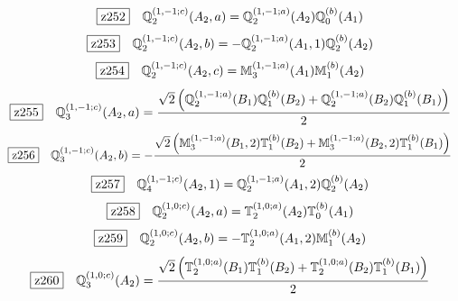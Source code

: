 \documentclass[fleqn,10pt,landscape]{jsarticle}
\begin{document}
\begin{dmath*}
\hspace*{3mm}\fbox{z252}\quad \mathbb{Q}_{2}^{(1,-1;c)}(A_{2},a)=\mathbb{Q}_{2}^{(1,-1;a)}(A_{2}) \mathbb{Q}_{0}^{(b)}(A_{1})
\end{dmath*}
\begin{dmath*}
\hspace*{3mm}\fbox{z253}\quad \mathbb{Q}_{2}^{(1,-1;c)}(A_{2},b)=- \mathbb{Q}_{2}^{(1,-1;a)}(A_{1},1) \mathbb{Q}_{2}^{(b)}(A_{2})
\end{dmath*}
\begin{dmath*}
\hspace*{3mm}\fbox{z254}\quad \mathbb{Q}_{2}^{(1,-1;c)}(A_{2},c)=\mathbb{M}_{3}^{(1,-1;a)}(A_{1}) \mathbb{M}_{1}^{(b)}(A_{2})
\end{dmath*}
\begin{dmath*}
\hspace*{3mm}\fbox{z255}\quad \mathbb{Q}_{3}^{(1,-1;c)}(A_{2},a)=\frac{\sqrt{2} \left(\mathbb{Q}_{2}^{(1,-1;a)}(B_{1}) \mathbb{Q}_{1}^{(b)}(B_{2}) + \mathbb{Q}_{2}^{(1,-1;a)}(B_{2}) \mathbb{Q}_{1}^{(b)}(B_{1})\right)}{2}
\end{dmath*}
\begin{dmath*}
\hspace*{3mm}\fbox{z256}\quad \mathbb{Q}_{3}^{(1,-1;c)}(A_{2},b)=- \frac{\sqrt{2} \left(\mathbb{M}_{3}^{(1,-1;a)}(B_{1},2) \mathbb{T}_{1}^{(b)}(B_{2}) + \mathbb{M}_{3}^{(1,-1;a)}(B_{2},2) \mathbb{T}_{1}^{(b)}(B_{1})\right)}{2}
\end{dmath*}
\begin{dmath*}
\hspace*{3mm}\fbox{z257}\quad \mathbb{Q}_{4}^{(1,-1;c)}(A_{2},1)=\mathbb{Q}_{2}^{(1,-1;a)}(A_{1},2) \mathbb{Q}_{2}^{(b)}(A_{2})
\end{dmath*}
\begin{dmath*}
\hspace*{3mm}\fbox{z258}\quad \mathbb{Q}_{2}^{(1,0;c)}(A_{2},a)=\mathbb{T}_{2}^{(1,0;a)}(A_{2}) \mathbb{T}_{0}^{(b)}(A_{1})
\end{dmath*}
\begin{dmath*}
\hspace*{3mm}\fbox{z259}\quad \mathbb{Q}_{2}^{(1,0;c)}(A_{2},b)=- \mathbb{T}_{2}^{(1,0;a)}(A_{1},2) \mathbb{M}_{1}^{(b)}(A_{2})
\end{dmath*}
\begin{dmath*}
\hspace*{3mm}\fbox{z260}\quad \mathbb{Q}_{3}^{(1,0;c)}(A_{2})=\frac{\sqrt{2} \left(\mathbb{T}_{2}^{(1,0;a)}(B_{1}) \mathbb{T}_{1}^{(b)}(B_{2}) + \mathbb{T}_{2}^{(1,0;a)}(B_{2}) \mathbb{T}_{1}^{(b)}(B_{1})\right)}{2}
\end{dmath*}
\end{document}

